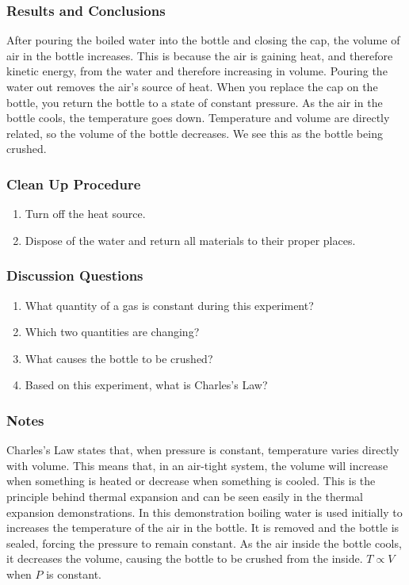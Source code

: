 \subsubsection*{Results and Conclusions}
After pouring the boiled water into the bottle and closing the cap, the volume of air in the bottle increases.  This is because the air is gaining heat, and therefore kinetic energy, from the water and therefore increasing in volume.  Pouring the water out removes the air's source of heat.  When you replace the cap on the bottle, you return the bottle to a state of constant pressure.  As the air in the bottle cools, the temperature goes down.  Temperature and volume are directly related, so the volume of the bottle decreases.  We see this as the bottle being crushed.

\subsubsection*{Clean Up Procedure}
\begin{enumerate}
\item{Turn off the heat source.} 
\item{Dispose of the water and return all materials to their proper places.} 
\end{enumerate}

\subsubsection*{Discussion Questions}
\begin{enumerate}
\item{What quantity of a gas is constant during this experiment?}
\item{Which two quantities are changing?}
\item{What causes the bottle to be crushed?}
\item{Based on this experiment, what is Charles's Law?}
\end{enumerate}

\subsubsection*{Notes}
Charles's Law states that, when pressure is constant, temperature varies directly with volume. This means that, in an air-tight system, the volume will increase when something is heated or decrease when something is cooled. This is the principle behind thermal expansion and can be seen easily in the thermal expansion demonstrations.  
In this demonstration boiling water is used initially to increases the temperature of the air in the bottle. It is removed and the bottle is sealed, forcing the pressure to remain constant. As the air inside the bottle cools, it decreases the volume, causing the bottle to be crushed from the inside. $T \propto V$ when $P$ is constant.
